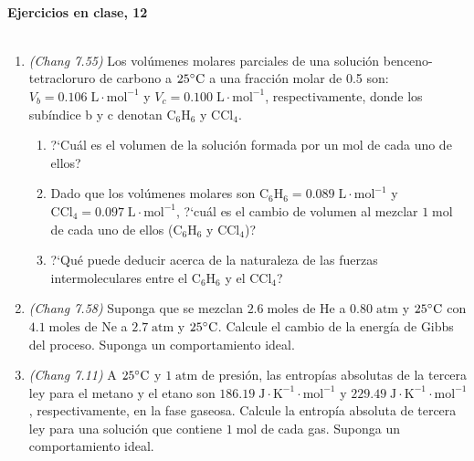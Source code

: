 \documentclass[a4paper,12pt]{article}
\begin{document}

\begin{center}
\HRule \\[0.4cm]
{ \bfseries Ejercicios en clase, 12}\\ %
\HRule \\[0.4cm]
\end{center}


\begin{enumerate}

 \item \textit{(Chang 7.55)} Los vol\'umenes molares parciales de una soluci\'on benceno-tetracloruro de carbono a $25\celsius$ a una fracci\'on molar de 0.5 son: $V_b=0.106\;\mbox{L}\cdot\mbox{mol}^{-1}$ y $V_c=0.100\;\mbox{L}\cdot\mbox{mol}^{-1}$, respectivamente, donde los sub\'indice b y c denotan $\mbox{C}_6\mbox{H}_6$ y $\mbox{CCl}_4$.
 \begin{enumerate}
  \item ?`Cu\'al es el volumen de la soluci\'on formada por un mol de cada uno de ellos?
  \item Dado que los vol\'umenes molares son $\mbox{C}_6\mbox{H}_6=0.089\;\mbox{L}\cdot\mbox{mol}^{-1}$ y $\mbox{CCl}_4=0.097\;\mbox{L}\cdot\mbox{mol}^{-1}$, ?`cu\'al es el cambio de volumen al mezclar $1\;\mbox{mol}$ de cada uno de ellos ($\mbox{C}_6\mbox{H}_6$ y $\mbox{CCl}_4$)?
  \item ?`Qu\'e puede deducir acerca de la naturaleza de las fuerzas intermoleculares entre el $\mbox{C}_6\mbox{H}_6$ y el $\mbox{CCl}_4$?
 \end{enumerate} %

 \item \textit{(Chang 7.58)} Suponga que se mezclan $2.6\;\mbox{moles}$ de $\mbox{He}$ a $0.80\;\mbox{atm}$ y $25\celsius$ con $4.1\;\mbox{moles}$ de $\mbox{Ne}$ a $2.7\;\mbox{atm}$ y $25\celsius$. Calcule el cambio de la energ\'ia de Gibbs del proceso. Suponga un comportamiento ideal. %

 \item \textit{(Chang 7.11)} A $25\celsius$ y $1\;\mbox{atm}$ de presi\'on, las entrop\'ias absolutas de la tercera ley para el metano y el etano son $186.19\;\mbox{J}\cdot\mbox{K}^{-1}\cdot\mbox{mol}^{-1}$ y $229.49\;\mbox{J}\cdot\mbox{K}^{-1}\cdot\mbox{mol}^{-1}$, respectivamente, en la fase gaseosa. Calcule la entrop\'ia absoluta de tercera ley para una soluci\'on que contiene $1\;\mbox{mol}$ de cada gas. Suponga un comportamiento ideal. %


\end{enumerate}
\end{document}
